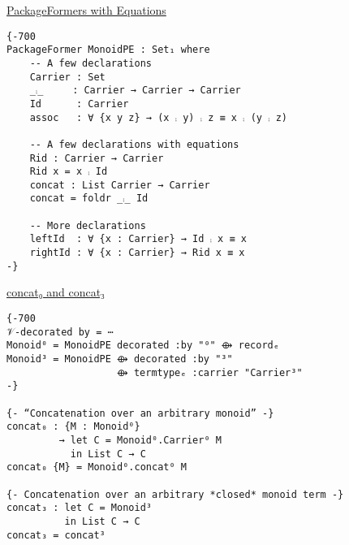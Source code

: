 \documentclass[sigplan,screen]{acmart}
\begin{document}
\begin{footnotesize}
\uline{PackageFormers with Equations}
\begin{verbatim}
{-700
PackageFormer MonoidPE : Set₁ where
    -- A few declarations
    Carrier : Set
    _⨾_     : Carrier → Carrier → Carrier
    Id      : Carrier
    assoc   : ∀ {x y z} → (x ⨾ y) ⨾ z ≡ x ⨾ (y ⨾ z)

    -- A few declarations with equations
    Rid : Carrier → Carrier
    Rid x = x ⨾ Id
    concat : List Carrier → Carrier
    concat = foldr _⨾_ Id

    -- More declarations
    leftId  : ∀ {x : Carrier} → Id ⨾ x ≡ x
    rightId : ∀ {x : Carrier} → Rid x ≡ x
-}
\end{verbatim}

\uline{concat₀ and concat₃}
\begin{verbatim}
{-700
𝒱-decorated by = ⋯
Monoid⁰ = MonoidPE decorated :by "⁰" ⟴ recordₑ
Monoid³ = MonoidPE ⟴ decorated :by "³"
                   ⟴ termtypeₑ :carrier "Carrier³"
-}

{- “Concatenation over an arbitrary monoid” -}
concat₀ : {M : Monoid⁰}
         → let C = Monoid⁰.Carrier⁰ M
           in List C → C
concat₀ {M} = Monoid⁰.concat⁰ M

{- Concatenation over an arbitrary *closed* monoid term -}
concat₃ : let C = Monoid³
          in List C → C
concat₃ = concat³
\end{verbatim}
\end{footnotesize}
\end{document}
